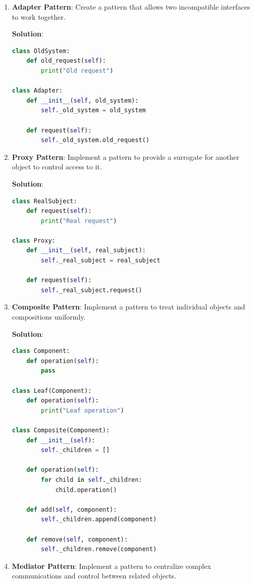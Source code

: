 \documentclass[12pt]{book}
\begin{document}
\begin{enumerate}
    \item \textbf{Adapter Pattern}: Create a pattern that allows two incompatible interfaces to work together.

    \textbf{Solution}:
    \begin{lstlisting}[language=Python]
class OldSystem:
    def old_request(self):
        print("Old request")

class Adapter:
    def __init__(self, old_system):
        self._old_system = old_system

    def request(self):
        self._old_system.old_request()
    \end{lstlisting}

    \item \textbf{Proxy Pattern}: Implement a pattern to provide a surrogate for another object to control access to it.

    \textbf{Solution}:
    \begin{lstlisting}[language=Python]
class RealSubject:
    def request(self):
        print("Real request")

class Proxy:
    def __init__(self, real_subject):
        self._real_subject = real_subject

    def request(self):
        self._real_subject.request()
    \end{lstlisting}

    \item \textbf{Composite Pattern}: Implement a pattern to treat individual objects and compositions uniformly.

    \textbf{Solution}:
    \begin{lstlisting}[language=Python]
class Component:
    def operation(self):
        pass

class Leaf(Component):
    def operation(self):
        print("Leaf operation")

class Composite(Component):
    def __init__(self):
        self._children = []

    def operation(self):
        for child in self._children:
            child.operation()

    def add(self, component):
        self._children.append(component)

    def remove(self, component):
        self._children.remove(component)
    \end{lstlisting}

    \item \textbf{Mediator Pattern}: Implement a pattern to centralize complex communications and control between related objects.


\end{enumerate}
\end{document}
